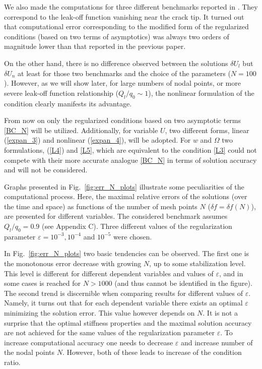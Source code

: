 

We also made the computations for three different benchmarks reported in \citet{MWL}. They correspond to the
leak-off function vanishing near the crack tip. It turned out that computational error corresponding to the modified form of the regularized conditions (based on two terms of asymptotics)
was always two orders of magnitude lower than that reported in the previous paper.

On the other hand, there is no difference observed between the solutions $\delta U_l$ but $\delta U_n$
at least for those two benchmarks and the choice of the parameters ($N=100$). However, as we will show  later,
for large numbers of nodal points, or more severe leak-off function relationship ($Q_l/q_0\sim1$),
the nonlinear formulation of the condition clearly manifests its advantage.

From now on only the regularized conditions based on two asymptotic terms \eqref{BC_N} will be utilized.
Additionally, for variable $U$, two different forms, linear
(\ref{expan_3}) and nonlinear (\ref{expan_4}), will be adopted.
For $w$ and $\Omega$ two  formulations, (\ref{L4}) and \eqref{L5}, which are equivalent
to the condition \eqref{L3} could not compete with
their more accurate analogue \eqref{BC_N} in terms of solution accuracy and will not be considered.




Graphs presented in Fig.~\ref{fig:err_N_plots} illustrate some peculiarities of the computational process.
Here, the maximal relative errors of the solutions (over the time and space) as functions of the number of mesh points $N$ ($\delta f=\delta f(N)$),
are presented for different variables. The considered benchmark assumes  $Q_l/q_0=0.9$ (see Appendix C).
Three different values of the regularization parameter $\varepsilon=10^{-3},10^{-4}$ and $10^{-5}$
were chosen.

\noindent
In Fig.~\ref{fig:err_N_plots} two basic tendencies can be observed. The first one is the
monotonous error decrease with growing $N$, up to some stabilization level. This level is different for different dependent variables and values of $\varepsilon$, and in some cases is reached for $N>1000$ (and thus cannot be identified in the figure). The second trend is discernible when comparing results for different values of $\varepsilon$. Namely, it turns out that for each dependent variable there exists an optimal  $\varepsilon$  minimizing the solution error. This value however depends on $N$.
It is not a surprise that the optimal stiffness properties and the maximal solution accuracy
are not achieved for the same values of the regularization parameter $\varepsilon$.
To increase computational accuracy one needs to decrease $\varepsilon$
and increase number of the nodal points $N$. However, both of these leads to increase of the condition ratio.

